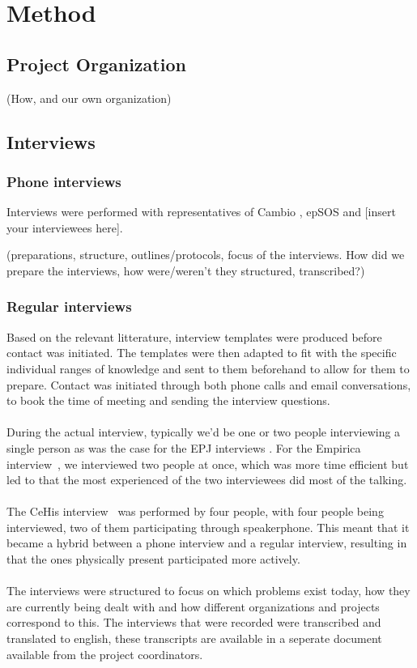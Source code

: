 \documentclass[14pt]{article}
\begin{document}
\newpage

\section{Method}

\subsection{Project Organization}
 (How, and our own organization)

\subsection{Interviews}
\subsubsection{Phone interviews}

Interviews were performed with representatives of Cambio \cite{Cambio}, epSOS \cite{epSOS} and [insert your interviewees here].

(preparations, structure, outlines/protocols, focus of the interviews.
How did we prepare the interviews, how were/weren't they structured, transcribed?)

\subsubsection{Regular interviews}

Based on the relevant litterature, interview templates were produced before contact was initiated. The templates were then adapted to fit with the specific individual ranges of knowledge and sent to them beforehand to allow for them to prepare. Contact was initiated through both phone calls and email conversations, to book the time of meeting and sending the interview questions.
\\\\
During the actual interview, typically we'd be one or two people interviewing a single person as was the case for the EPJ interviews \cite{EPJ1} \cite{EPJ2}. For the Empirica interview~\cite{Empirica}, we interviewed two people at once, which was more time efficient but led to that the most experienced of the two interviewees did most of the talking.
\\\\
The CeHis interview~\cite{CeHis} was performed by four people, with four people being interviewed, two of them participating through speakerphone. This meant that it became a hybrid between a phone interview and a regular interview, resulting in that the ones physically present participated more actively. 
\\\\
The interviews were structured to focus on which problems exist today, how they are currently being dealt with and how different organizations and projects correspond to this. The interviews that were recorded were transcribed and translated to english, these transcripts are available in a seperate document available from the project coordinators.
\end{document}
